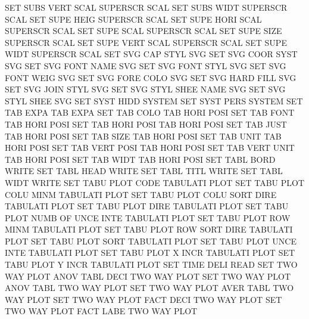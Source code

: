 SET      SUBS VERT SCAL                 SUPERSCR SCAL
SET      SUBS WIDT                      SUPERSCR SCAL
SET      SUPE HEIG                      SUPERSCR SCAL
SET      SUPE HORI SCAL                 SUPERSCR SCAL
SET      SUPE SCAL                      SUPERSCR SCAL
SET      SUPE SIZE                      SUPERSCR SCAL
SET      SUPE VERT SCAL                 SUPERSCR SCAL
SET      SUPE WIDT                      SUPERSCR SCAL
SET      SVG  CAP  STYL                 SVG
SET      SVG  COOR SYST                 SVG
SET      SVG  FONT NAME                 SVG
SET      SVG  FONT STYL                 SVG
SET      SVG  FONT WEIG                 SVG
SET      SVG  FORE COLO                 SVG
SET      SVG  HARD FILL                 SVG
SET      SVG  JOIN STYL                 SVG
SET      SVG  STYL SHEE NAME            SVG
SET      SVG  STYL SHEE                 SVG
SET      SYST HIDD                      SYSTEM
SET      SYST PERS                      SYSTEM
SET      TAB  EXPA                      TAB      EXPA
SET      TAB  COLO                      TAB HORI POSI
SET      TAB  FONT                      TAB HORI POSI
SET      TAB  HORI POSI                 TAB HORI POSI
SET      TAB  JUST                      TAB HORI POSI
SET      TAB  SIZE                      TAB HORI POSI
SET      TAB  UNIT                      TAB HORI POSI
SET      TAB  VERT POSI                 TAB HORI POSI
SET      TAB  VERT UNIT                 TAB HORI POSI
SET      TAB  WIDT                      TAB HORI POSI
SET      TABL BORD                      WRITE
SET      TABL HEAD                      WRITE
SET      TABL TITL                      WRITE
SET      TABL WIDT                      WRITE
SET      TABU PLOT CODE                 TABULATI PLOT
SET      TABU PLOT COLU MINM            TABULATI PLOT
SET      TABU PLOT COLU SORT DIRE       TABULATI PLOT
SET      TABU PLOT DIRE                 TABULATI PLOT
SET      TABU PLOT NUMB OF   UNCE INTE  TABULATI PLOT
SET      TABU PLOT ROW  MINM            TABULATI PLOT
SET      TABU PLOT ROW  SORT DIRE       TABULATI PLOT
SET      TABU PLOT SORT                 TABULATI PLOT
SET      TABU PLOT UNCE INTE            TABULATI PLOT
SET      TABU PLOT X    INCR            TABULATI PLOT
SET      TABU PLOT Y    INCR            TABULATI PLOT
SET      TIME DELI                      READ
SET      TWO  WAY  PLOT ANOV TABL DECI  TWO      WAY  PLOT
SET      TWO  WAY  PLOT ANOV TABL       TWO      WAY  PLOT
SET      TWO  WAY  PLOT AVER TABL       TWO      WAY  PLOT
SET      TWO  WAY  PLOT FACT DECI       TWO      WAY  PLOT
SET      TWO  WAY  PLOT FACT LABE       TWO      WAY  PLOT
